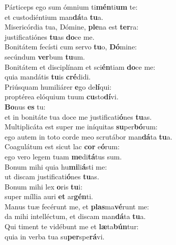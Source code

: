 \oddverse Párticeps ego sum ómnium ti\textbf{mén}ti\textbf{um} te:~\*\\
\oddverse et custodiéntium man\textbf{dá}ta \textbf{tu}a.\\
\evenverse Misericórdia tua, Dómine, \textbf{ple}na est \textbf{ter}ra:~\*\\
\evenverse justificatiónes \textbf{tu}as \textbf{do}ce me.\\
\oddverse Bonitátem fecísti cum servo \textbf{tu}o, \textbf{Dó}mine:~\*\\
\oddverse secúndum \textbf{ver}bum \textbf{tu}um.\\
\evenverse Bonitátem et disciplínam et sci\textbf{én}tiam \textbf{do}ce me:~\*\\
\evenverse quia mandátis \textbf{tu}is \textbf{cré}didi.\\
\oddverse Priúsquam humiliárer \textbf{e}go de\textbf{lí}qui:~\*\\
\oddverse proptérea elóquium tuum \textbf{cu}sto\textbf{dí}vi.\\
\evenverse \textbf{Bo}nus \textbf{es} tu:~\*\\
\evenverse et in bonitáte tua doce me justificati\textbf{ó}nes \textbf{tu}as.\\
\oddverse Multiplicáta est super me iníquitas \textbf{su}per\textbf{bó}rum:~\*\\
\oddverse ego autem in toto corde meo scrutábor man\textbf{dá}ta \textbf{tu}a.\\
\evenverse Coagulátum est sicut lac \textbf{cor} e\textbf{ó}rum:~\*\\
\evenverse ego vero legem tuam \textbf{me}di\textbf{tá}tus sum.\\
\oddverse Bonum mihi quia hu\textbf{mi}li\textbf{á}sti me:~\*\\
\oddverse ut discam justificati\textbf{ó}nes \textbf{tu}as.\\
\evenverse Bonum mihi lex \textbf{o}ris \textbf{tu}i:~\*\\
\evenverse super míllia auri \textbf{et} ar\textbf{gén}ti.\\
\oddverse Manus tuæ fecérunt me, et \textbf{plas}ma\textbf{vé}runt me:~\*\\
\oddverse da mihi intelléctum, et discam man\textbf{dá}ta \textbf{tu}a.\\
\evenverse Qui timent te vidébunt me et \textbf{læ}ta\textbf{bún}tur:~\*\\
\evenverse quia in verba tua su\textbf{per}spe\textbf{rá}vi.\\
